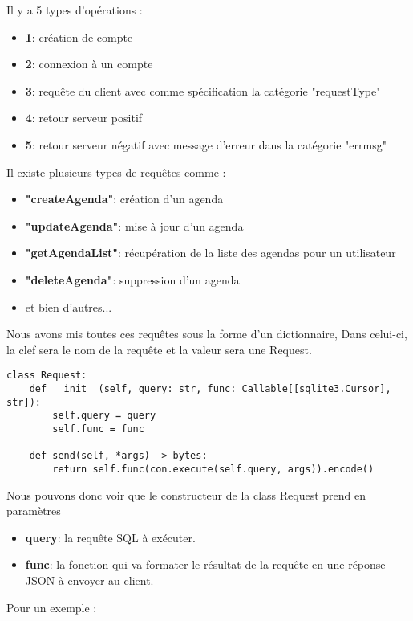 \documentclass{article}
\begin{document}
\noindent Il y a 5 types d'opérations :
\begin{itemize}
    \item \textbf{1}: création de compte
    \item \textbf{2}: connexion à un compte
    \item \textbf{3}: requête du client avec comme spécification la catégorie "requestType"
    \item \textbf{4}: retour serveur positif
    \item \textbf{5}: retour serveur négatif avec message d'erreur dans la catégorie "errmsg"
\end{itemize}

\vspace{\medskipamount}
\noindent Il existe plusieurs types de requêtes comme :
\begin{itemize}
    \item \textbf{"createAgenda"}: création d'un agenda
    \item \textbf{"updateAgenda"}: mise à jour d'un agenda
    \item \textbf{"getAgendaList"}: récupération de la liste des agendas pour un utilisateur
    \item \textbf{"deleteAgenda"}: suppression d'un agenda
    \item et bien d'autres...
\end{itemize}

Nous avons mis toutes ces requêtes sous la forme d'un dictionnaire,
Dans celui-ci, la clef sera le nom de la requête et la valeur sera une Request.

\begin{lstlisting}
class Request:
    def __init__(self, query: str, func: Callable[[sqlite3.Cursor], str]):
        self.query = query
        self.func = func

    def send(self, *args) -> bytes:
        return self.func(con.execute(self.query, args)).encode()
\end{lstlisting}

Nous pouvons donc voir que le constructeur de la class Request prend en paramètres
\begin{itemize}
    \item \textbf{query}: la requête SQL à exécuter.
    \item \textbf{func}: la fonction qui va formater le résultat de la requête en une réponse JSON à envoyer au client.
\end{itemize}

Pour un exemple :
\end{document}
